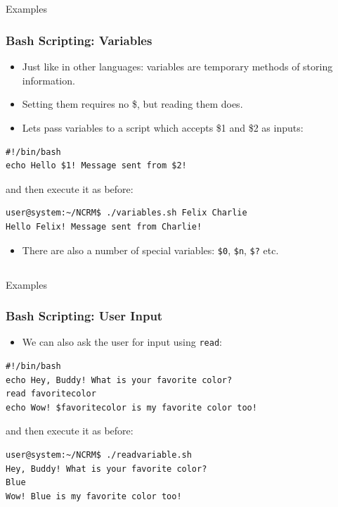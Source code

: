 \documentclass[10pt]{beamer}
\begin{document}
\subsection{}
\begin{frame}[fragile]{Examples}
\frametitle{Bash Scripting: Variables}
\begin{itemize}
\item Just like in other languages: variables are temporary methods of storing information.\vspace{0.05in}
\item Setting them requires no \$, but reading them does.\vspace{0.05in}
\item Lets pass variables to a script which accepts \$1 and \$2 as inputs:\vspace{0.05in}
\end{itemize}
\begin{lstlisting}[style=BashInputStyle,title=Accepting Variables: \texttt{mysecondscript.sh}]
#!/bin/bash
echo Hello $1! Message sent from $2!
\end{lstlisting}\vspace{0.05in}
\quad and then execute it as before:\vspace{0.05in}
\begin{lstlisting}[style=BashInputStyle,title=Executing \texttt{mysecondscript.sh}]
user@system:~/NCRM$ ./variables.sh Felix Charlie
Hello Felix! Message sent from Charlie!
\end{lstlisting}\vspace{0.05in}
\begin{itemize}
\item There are also a number of special variables: \texttt{\$0}, \texttt{\$n}, \texttt{\$?} etc.
\end{itemize}
\end{frame}

\subsection{}
\begin{frame}[fragile]{Examples}
\frametitle{Bash Scripting: User Input}
\begin{itemize}
\item We can also ask the user for input using \texttt{read}:
\end{itemize}
\begin{lstlisting}[style=BashInputStyle,title=Asking for User Input: \texttt{mythirdscript.sh}]
#!/bin/bash
echo Hey, Buddy! What is your favorite color?
read favoritecolor
echo Wow! $favoritecolor is my favorite color too!
\end{lstlisting}\vspace{0.1in}
\quad and then execute it as before:\vspace{0.1in}
\begin{lstlisting}[style=BashInputStyle,title=Executing \texttt{mythirdscript.sh}]
user@system:~/NCRM$ ./readvariable.sh
Hey, Buddy! What is your favorite color?
Blue
Wow! Blue is my favorite color too!
\end{lstlisting}\vspace{0.1in}
\end{frame}
\end{document}
